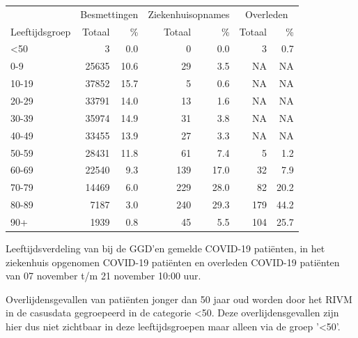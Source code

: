 \documentclass[
  english,
  man,floatsintext]{apa6}
\begin{document}
\begin{table}
\centering\begingroup\fontsize{11}{13}\selectfont

\begin{threeparttable}
\begin{tabular}{lrrrrrr}
\toprule
\multicolumn{1}{c}{ } & \multicolumn{2}{c}{Besmettingen} & \multicolumn{2}{c}{Ziekenhuisopnames} & \multicolumn{2}{c}{Overleden} \\
\cmidrule(l{3pt}r{3pt}){2-3} \cmidrule(l{3pt}r{3pt}){4-5} \cmidrule(l{3pt}r{3pt}){6-7}
Leeftijdsgroep & Totaal & \% & Totaal & \% & Totaal & \%\\
\midrule
<50 & 3 & 0.0 & 0 & 0.0 & 3 & 0.7\\
0-9 & 25635 & 10.6 & 29 & 3.5 & NA & NA\\
10-19 & 37852 & 15.7 & 5 & 0.6 & NA & NA\\
20-29 & 33791 & 14.0 & 13 & 1.6 & NA & NA\\
30-39 & 35974 & 14.9 & 31 & 3.8 & NA & NA\\
40-49 & 33455 & 13.9 & 27 & 3.3 & NA & NA\\
50-59 & 28431 & 11.8 & 61 & 7.4 & 5 & 1.2\\
60-69 & 22540 & 9.3 & 139 & 17.0 & 32 & 7.9\\
70-79 & 14469 & 6.0 & 229 & 28.0 & 82 & 20.2\\
80-89 & 7187 & 3.0 & 240 & 29.3 & 179 & 44.2\\
90+ & 1939 & 0.8 & 45 & 5.5 & 104 & 25.7\\
\bottomrule
\end{tabular}
\begin{tablenotes}
\item[1] Leeftijdsverdeling van bij de GGD’en gemelde COVID-19 patiënten, in het ziekenhuis opgenomen COVID-19 patiënten en overleden COVID-19 patiënten van 07 november t/m 21 november 10:00 uur.
\item[2] Overlijdensgevallen van patiënten jonger dan 50 jaar oud worden door het RIVM in de casusdata gegroepeerd in de categorie <50. Deze overlijdensgevallen zijn hier dus niet zichtbaar in deze leeftijdsgroepen maar alleen via de groep '<50'.
\end{tablenotes}
\end{threeparttable}
\endgroup{}
\end{table}

\newpage
\end{document}
